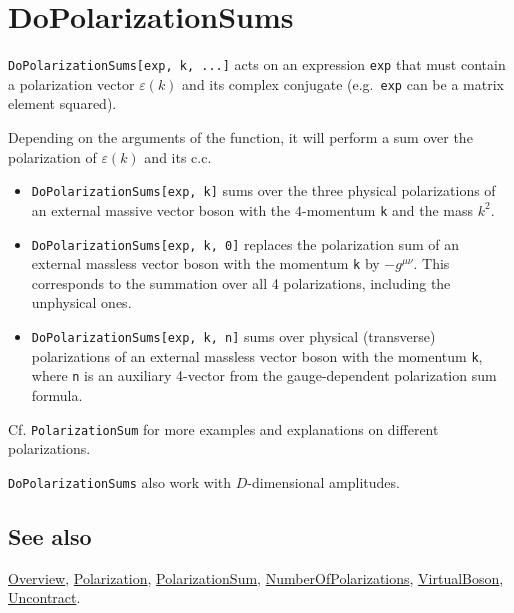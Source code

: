 \documentclass[../FeynCalcManual.tex]{subfiles}
\begin{document}
\hypertarget{dopolarizationsums}{
\section{DoPolarizationSums}\label{dopolarizationsums}}

\texttt{DoPolarizationSums[\allowbreak{}exp,\ \allowbreak{}k,\ \allowbreak{}...]}
acts on an expression \texttt{exp} that must contain a polarization
vector \(\varepsilon(k)\) and its complex conjugate (e.g.~\texttt{exp}
can be a matrix element squared).

Depending on the arguments of the function, it will perform a sum over
the polarization of \(\varepsilon(k)\) and its c.c.

\begin{itemize}
\tightlist
\item
  \texttt{DoPolarizationSums[\allowbreak{}exp,\ \allowbreak{}k]} sums
  over the three physical polarizations of an external massive vector
  boson with the \(4\)-momentum \texttt{k} and the mass \(k^2\).
\item
  \texttt{DoPolarizationSums[\allowbreak{}exp,\ \allowbreak{}k,\ \allowbreak{}0]}
  replaces the polarization sum of an external massless vector boson
  with the momentum \texttt{k} by \(-g^{\mu \nu}\). This corresponds to
  the summation over all 4 polarizations, including the unphysical ones.
\item
  \texttt{DoPolarizationSums[\allowbreak{}exp,\ \allowbreak{}k,\ \allowbreak{}n]}
  sums over physical (transverse) polarizations of an external massless
  vector boson with the momentum \texttt{k}, where \texttt{n} is an
  auxiliary 4-vector from the gauge-dependent polarization sum formula.
\end{itemize}

Cf. \texttt{PolarizationSum} for more examples and explanations on
different polarizations.

\texttt{DoPolarizationSums} also work with \(D\)-dimensional amplitudes.

\subsection{See also}

\hyperlink{toc}{Overview}, \hyperlink{polarization}{Polarization},
\hyperlink{polarizationsum}{PolarizationSum},
\hyperlink{numberofpolarizations}{NumberOfPolarizations},
\hyperlink{virtualboson}{VirtualBoson},
\hyperlink{uncontract}{Uncontract}.
\end{document}
